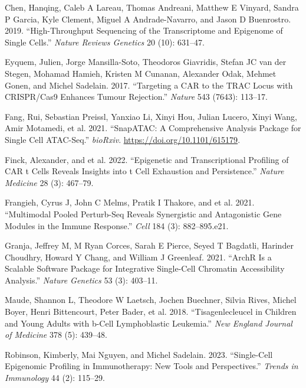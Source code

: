 \documentclass[
]{article}
\newlength{\cslhangindent}
\newenvironment{CSLReferences}[2] %
 {\begin{list}{}{%
  \setlength{\itemindent}{0pt}
  \setlength{\leftmargin}{0pt}
  \setlength{\parsep}{0pt}
  \ifodd #1
   \setlength{\leftmargin}{\cslhangindent}
   \setlength{\itemindent}{-1\cslhangindent}
  \fi
  \setlength{\itemsep}{#2\baselineskip}}}
 {\end{list}}
\begin{document}
\protect{}\label{refs}
\begin{CSLReferences}{1}{0}
Chen, Hanqing, Caleb A Lareau, Thomas Andreani, Matthew E Vinyard,
Sandra P Garcia, Kyle Clement, Miguel A Andrade-Navarro, and Jason D
Buenrostro. 2019. {``High-Throughput Sequencing of the Transcriptome and
Epigenome of Single Cells.''} \emph{Nature Reviews Genetics} 20 (10):
631--47.

Eyquem, Julien, Jorge Mansilla-Soto, Theodoros Giavridis, Stefan JC van
der Stegen, Mohamad Hamieh, Kristen M Cunanan, Alexander Odak, Mehmet
Gonen, and Michel Sadelain. 2017. {``Targeting a CAR to the TRAC Locus
with CRISPR/Cas9 Enhances Tumour Rejection.''} \emph{Nature} 543 (7643):
113--17.

Fang, Rui, Sebastian Preissl, Yanxiao Li, Xinyi Hou, Julian Lucero,
Xinyi Wang, Amir Motamedi, et al. 2021. {``SnapATAC: A Comprehensive
Analysis Package for Single Cell ATAC-Seq.''} \emph{bioRxiv}.
\url{https://doi.org/10.1101/615179}.

Finck, Alexander, and et al. 2022. {``Epigenetic and Transcriptional
Profiling of CAR t Cells Reveals Insights into t Cell Exhaustion and
Persistence.''} \emph{Nature Medicine} 28 (3): 467--79.

Frangieh, Cyrus J, John C Melms, Pratik I Thakore, and et al. 2021.
{``Multimodal Pooled Perturb-Seq Reveals Synergistic and Antagonistic
Gene Modules in the Immune Response.''} \emph{Cell} 184 (3):
882--895.e21.

Granja, Jeffrey M, M Ryan Corces, Sarah E Pierce, Seyed T Bagdatli,
Harinder Choudhry, Howard Y Chang, and William J Greenleaf. 2021.
{``ArchR Is a Scalable Software Package for Integrative Single-Cell
Chromatin Accessibility Analysis.''} \emph{Nature Genetics} 53 (3):
403--11.

Maude, Shannon L, Theodore W Laetsch, Jochen Buechner, Silvia Rives,
Michel Boyer, Henri Bittencourt, Peter Bader, et al. 2018.
{``Tisagenlecleucel in Children and Young Adults with b-Cell
Lymphoblastic Leukemia.''} \emph{New England Journal of Medicine} 378
(5): 439--48.

Robinson, Kimberly, Mai Nguyen, and Michel Sadelain. 2023.
{``Single-Cell Epigenomic Profiling in Immunotherapy: New Tools and
Perspectives.''} \emph{Trends in Immunology} 44 (2): 115--29.


\end{CSLReferences}
\end{document}

